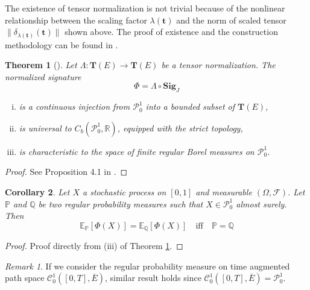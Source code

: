 \documentclass[12pt]{report}
\newtheorem{theorem}{Theorem}[chapter]
\newtheorem{corollary}[theorem]{Corollary}
\theoremstyle{definition}
\theoremstyle{remark}
\newtheorem*{remark}{Remark}
\newcommand{\R}{\mathbb{R}}
\newcommand{\E}{\mathbb{E}}
\renewcommand{\P}{\mathbb{P}}
\begin{document}
The existence of tensor normalization is not trivial because of the nonlinear relationship between the scaling factor $\lambda(\mathbf{t})$ and the norm of scaled tensor $\lVert \delta_{\lambda(\mathbf{t} )}(\mathbf{t} ) \rVert $ shown above. The proof of existence and the construction methodology can be found in \cite{chevyrev2018signature}. 
\begin{theorem}[\cite{chevyrev2018signature}]\label{moment_law}
  Let $\Lambda \colon \mathbf{T}(E) \to \mathbf{T}(E)$ be a tensor normalization. The normalized signature 
  \begin{equation}
    \Phi = \Lambda \circ \mathbf{Sig}_{J}
  \end{equation}
  \begin{enumerate}[(i)]
    \item is a continuous injection from $\mathcal{P}_{0}^{1}$ into a bounded subset of $\mathbf{T}(E)$,
    \item is universal to $C_{b}(\mathcal{P}_{0}^{1},\R)$, equipped with the strict topology, 
    \item is characteristic to the space of finite regular Borel measures on $\mathcal{P}_{0}^{1}$.
  \end{enumerate}
\end{theorem}  
\begin{proof}
  See Proposition 4.1 in \cite{chevyrev2018signature}.
\end{proof}
\begin{corollary}\label{equalequal}
  Let $X$ a stochastic process on $[0,1]$ and measurable $(\Omega,\mathcal{F})$. Let $\P$ and $\mathbb{Q}$ be two regular probability measures such that $X \in \mathcal{P}_{0}^{1}$ almost surely. Then 
  \begin{equation}
    \E_{\P}[\Phi(X)] = \E_{\mathbb{Q}}[\Phi(X)]\quad\text{iff}\quad \P = \mathbb{Q}
  \end{equation} 
\end{corollary}
\begin{proof}
 Proof directly from (iii) of Theorem \ref{moment_law}.
\end{proof}
\begin{remark}
  If we consider the regular probability measure on time augmented path space $\mathcal{C}^{1}_{0}([0,T],\overline{E})$, similar result holds since $\mathcal{C}^{1}_{0}([0,T],\overline{E}) = \mathcal{P}_{0}^{1}$.
\end{remark}
\end{document}
